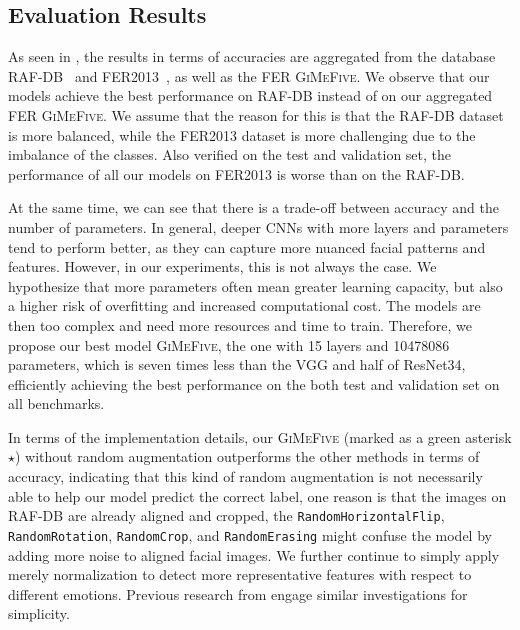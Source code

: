 \subsection{Evaluation Results}
\label{sec:evaluation:results}

As seen in , 
the results in terms of accuracies are aggregated from the database RAF-DB~\cite{kaggle_rafdb} and FER2013~\cite{kaggle_fer}, 
as well as the FER \textsc{GiMeFive}. 
We observe that our models achieve the best performance on RAF-DB instead of on our aggregated FER \textsc{GiMeFive}. 
We assume that the reason for this is that the RAF-DB dataset is more balanced, 
while the FER2013 dataset is more challenging due to the imbalance of the classes. 
Also verified on the test and validation set, 
the performance of all our models on FER2013 is worse than on the RAF-DB. 

At the same time, 
we can see that there is a trade-off between accuracy and the number of parameters. 
In general, 
deeper CNNs with more layers and parameters tend to perform better, 
as they can capture more nuanced facial patterns and features. 
However, in our experiments, 
this is not always the case. 
We hypothesize that more parameters often mean greater learning capacity, 
but also a higher risk of overfitting and increased computational cost. 
The models are then too complex and need more resources and time to train. 
Therefore, we propose our best model \textsc{GiMeFive}, 
the one with 15 layers and 10478086 parameters, 
which is seven times less than the VGG and half of ResNet34, 
efficiently achieving the best performance on the both test and validation set on all benchmarks. 

In terms of the implementation details, 
our \textsc{GiMeFive} 
(marked as a green asterisk \textcolor{LMUGreen}{$\star$}) without random augmentation outperforms the other methods in terms of accuracy, 
indicating that this kind of random augmentation is not necessarily able to help our model predict the correct label, 
one reason is that the images on RAF-DB are already aligned and cropped, 
the \texttt{RandomHorizontalFlip}, \texttt{RandomRotation}, 
\texttt{RandomCrop}, and \texttt{RandomErasing} might confuse the model by adding more noise to aligned facial images. 
We further continue to simply apply merely normalization to detect more representative features with respect to different emotions.
Previous research from \citet{ZeilerF14,li_reliable_2017,VermaMRMV23} engage similar investigations for simplicity. 


